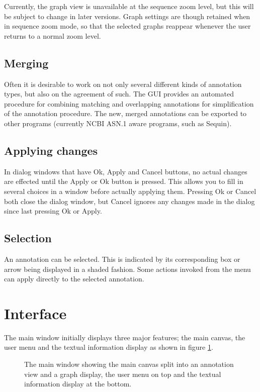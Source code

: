Currently, the graph view is unavailable at the sequence zoom level,
but this will be subject to change in later versions. Graph settings
are though retained when in sequence zoom mode, so that the selected
graphs reappear whenever the user returns to a normal zoom level.

\subsection{Merging}
Often it is desirable to work on not only several different kinds of
annotation types, but also on the agreement of such. The GUI provides
an automated procedure for combining matching and overlapping
annotations for simplification of the annotation procedure. The new,
merged annotations can be exported to other programs (currently NCBI
ASN.1 aware programs, such as Sequin).

\subsection{Applying changes}
In dialog windows that have Ok, Apply and Cancel buttons, no actual
changes are effected until the Apply or Ok button is pressed. This
allows you to fill in several choices in a window before actually
applying them. Pressing Ok or Cancel both close the dialog window, but
Cancel ignores any changes made in the dialog since last pressing Ok
or Apply.

\subsection{Selection}
An annotation can be selected. This is indicated by its corresponding box or 
arrow being displayed in a shaded fashion. Some actions invoked from the menu can 
apply directly to the selected annotation.

\section{Interface}
The main window initially displays three major features; the main
canvas, the user menu and the textual information display as shown in
figure \ref{fig:GUIgen}.

\begin{figure}[htbp]
	\begin{center}
	\end{center}
\caption{The main window showing the main canvas split into an annotation view and a graph display, the user menu on top and the textual information display at the bottom.}
\label{fig:GUIgen}
\end{figure}

